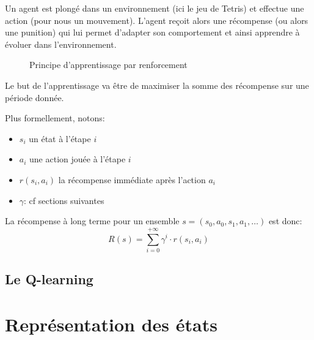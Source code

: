 \documentclass{report}
\begin{document}
Un agent est plongé dans un environnement (ici le jeu de Tetris) et effectue une
action (pour nous un mouvement). L'agent reçoit alors une récompense (ou alors
une punition) qui lui permet d'adapter son comportement et ainsi apprendre à
évoluer dans l'environnement.

\begin{figure}[h]
    \begin{center}
    \end{center}

    \caption{Principe d'apprentissage par renforcement}
    \label{}
\end{figure}

Le but de l'apprentissage va être de maximiser la somme des récompense sur une
période donnée.

Plus formellement, notons:
\begin{itemize}
    \item \( s_i \) un état à l'étape \( i \)
    \item \( a_i \) une action jouée à l'étape \( i \)
    \item \( r(s_i, a_i) \) la récompense immédiate après l'action \( a_i \)
    \item \( \gamma \): cf sections suivantes %
\end{itemize}

La récompense à long terme pour un ensemble
\( s = (s_0, a_0, s_1, a_1, \hdots) \) est donc:
\[
R(s) = \sum_{i=0}^{+\infty}\gamma^i \cdot r(s_i, a_i)
\]


\subsection{Le Q-learning}



\section{Représentation des états}
\end{document}
